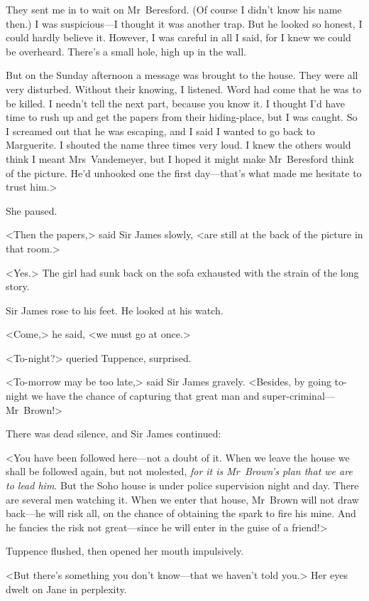 They sent me in to wait on Mr~Beresford. (Of course I didn't know his name then.) I was suspicious—I thought it was another trap. But he looked so honest, I could hardly believe it. However, I was careful in all I said, for I knew we could be overheard. There's a small hole, high up in the wall.

But on the Sunday afternoon a message was brought to the house. They were all very disturbed. Without their knowing, I listened. Word had come that he was to be killed. I needn't tell the next part, because you know it. I thought I'd have time to rush up and get the papers from their hiding-place, but I was caught. So I screamed out that he was escaping, and I said I wanted to go back to Marguerite. I shouted the name three times very loud. I knew the others would think I meant Mrs~Vandemeyer, but I hoped it might make Mr~Beresford think of the picture. He'd unhooked one the first day—that's what made me hesitate to trust him.>

She paused.

<Then the papers,> said Sir James slowly, <are still at the back of the picture in that room.>

<Yes.> The girl had sunk back on the sofa exhausted with the strain of the long story.

Sir James rose to his feet. He looked at his watch.

<Come,> he said, <we must go at once.>

<To-night?> queried Tuppence, surprised.

<To-morrow may be too late,> said Sir James gravely. <Besides, by going to-night we have the chance of capturing that great man and super-criminal—Mr~Brown!>

There was dead silence, and Sir James continued:

<You have been followed here—not a doubt of it. When we leave the house we shall be followed again, but not molested, \emph{for it is Mr~Brown's plan that we are to lead him}. But the Soho house is under police supervision night and day. There are several men watching it. When we enter that house, Mr~Brown will not draw back—he will risk all, on the chance of obtaining the spark to fire his mine. And he fancies the risk not great—since he will enter in the guise of a friend!>

Tuppence flushed, then opened her mouth impulsively.

<But there's something you don't know—that we haven't told you.> Her eyes dwelt on Jane in perplexity.

